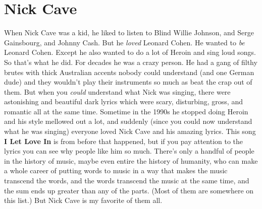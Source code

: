 \documentclass[letterpaper,single]{article}
\begin{document}
\section{Nick Cave}
When Nick Cave was a kid, he liked to listen to Blind Willie Johnson, and Serge Gainsbourg, and Johnny Cash. 
But he \emph{loved} Leonard Cohen. 
He wanted to \emph{be} Leonard Cohen. 
Except he also wanted to do a lot of Heroin and sing loud songs. 
So that's what he did. 
For decades he was a crazy person. 
He had a gang of filthy brutes with thick Australian accents nobody could understand (and one German dude) and they wouldn't play their instruments so much as beat the crap out of them. 
But when you \emph{could} understand what Nick was singing, there were astonishing and beautiful dark lyrics which were scary, disturbing, gross, and romantic all at the same time. 
Sometime in the 1990s he stopped doing Heroin and his style mellowed out a lot, and suddenly (since you could now understand what he was singing) everyone loved Nick Cave and his amazing lyrics.
This song \textbf{I Let Love In} is from before that happened, but if you pay attention to the lyrics you can see why people like him so much.
There's only a handful of people in the history of music, maybe even entire the history of humanity, who can make a whole career of putting words to music in a way that makes the music transcend the words, and the words transcend the music at the same time, and the sum ends up greater than any of the parts.
(Most of them are somewhere on this list.)
But Nick Cave is my favorite of them all.
\end{document}

